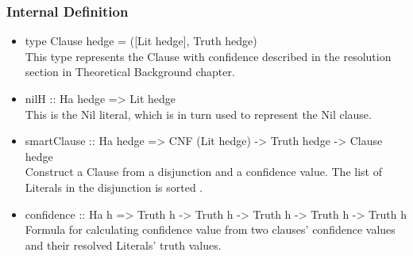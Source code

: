 \documentclass[../gr-final.tex]{subfiles}
\begin{document}
\subsubsection{Internal Definition}
\begin{itemize}
        \item type Clause hedge = ([Lit hedge], Truth hedge)\\
                This type represents the Clause with confidence
                described in the resolution section in
                Theoretical Background chapter.
        \item nilH :: Ha hedge => Lit hedge\\
                This is the Nil literal, which is in turn used to 
                represent the Nil clause.
        \item smartClause :: Ha hedge => CNF (Lit hedge) -> Truth hedge ->
                Clause hedge\\
                Construct a Clause from a disjunction and a
                confidence value. The list of Literals in
                the disjunction is sorted .
        \item confidence :: Ha h => Truth h -> Truth h -> Truth h -> Truth h ->
                Truth h\\
                Formula for calculating confidence value from two
                clauses' confidence values and their resolved
                Literals' truth values.


\end{itemize}
\end{document}
